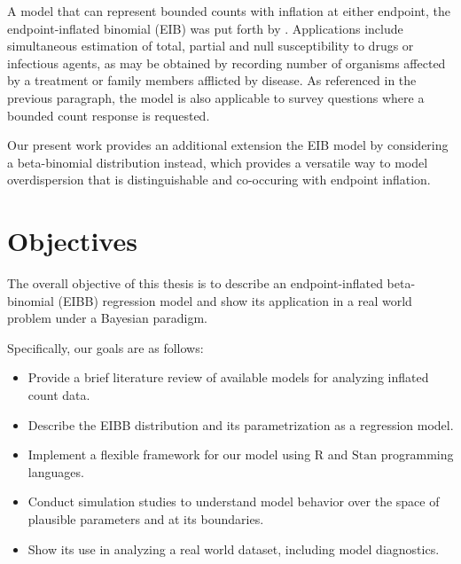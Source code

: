 A model that can represent bounded counts with inflation at either endpoint, the endpoint-inflated binomial (EIB) was put forth by \cite{Tian2015}. Applications include simultaneous estimation of total, partial and null susceptibility to drugs or infectious agents, as may be obtained by recording number of organisms affected by a treatment or family members afflicted by disease. As referenced in the previous paragraph, the model is also applicable to survey questions where a bounded count response is requested.

Our present work provides an additional extension the EIB model by considering a beta-binomial distribution instead, which provides a versatile way to model overdispersion that is distinguishable and co-occuring with endpoint inflation.

\section{Objectives}
\label{sec:introduction_objectives}

The overall objective of this thesis is to describe an endpoint-inflated beta-binomial (EIBB) regression model and show its application in a real world problem under a Bayesian paradigm.

Specifically, our goals are as follows:

\begin{itemize}
\item Provide a brief literature review of available models for analyzing inflated count data.
\item Describe the EIBB distribution and its parametrization as a regression model.
\item Implement a flexible framework for our model using $\text{R}$ and $\text{Stan}$ programming languages.
\item Conduct simulation studies to understand model behavior over the space of plausible parameters and at its boundaries.
\item Show its use in analyzing a real world dataset, including model diagnostics.
\end{itemize}